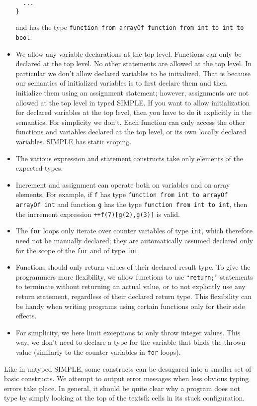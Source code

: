 \begin{latexComment}
\begin{itemize}
\begin{verbatim}
  ...
}
\end{verbatim}
and has the type
\texttt{function from arrayOf function from int to int to bool}.
\item We allow any variable declarations at the top level.  Functions
can only be declared at the top level.  No other statements are
allowed at the top level.  In particular we don't allow declared
variables to be initialized. That is because our semantics of
initialized variables is to first declare them and then initialize
them using an assignment statement; however, assignments are not
allowed at the top level in typed SIMPLE.  If you want to allow
initialization for declared variables at the top level, then you have
to do it explicitly in the semantics.  For simplicity we don't.
Each function can only access the other functions and variables
declared at the top level, or its own locally declared variables.
SIMPLE has static scoping.
\item The various expression and statement constructs take only
elements of the expected types.
\item Increment and assignment can operate both on variables and on
array elements.  For example, if \texttt{f} has type
\texttt{function from int to arrayOf arrayOf int} and function
\texttt{g} has the type \texttt{function from int to int}, then the
increment expression \texttt{++f(7)[g(2),g(3)]} is valid.
\item The \texttt{for} loops only iterate over counter variables of
type \texttt{int}, which therefore need not be manually declared; they
are automatically assumed declared only for the scope of the
\texttt{for} and of type \texttt{int}.
\item Functions should only return values of their declared result
type.  To give the programmers more flexibility, we allow functions to
use ``\texttt{return;}'' statements to terminate without returning an
actual value, or to not explicitly use any return statement,
regardless of their declared return type.  This flexibility can be
handy when writing programs using certain functions only for their
side effects.
\item For simplicity, we here limit exceptions to only throw integer
values.  This way, we don't need to declare a type for the variable
that binds the thrown value (similarly to the counter variables in
\texttt{for} loops).
\end{itemize}
Like in untyped SIMPLE, some constructs can be desugared into a
smaller set of basic constructs.  We attempt to output error messages
when less obvious typing errors take place.  In general, it should be
quite clear why a program does not type by simply looking at the top
of the textsf{k} cells in its stuck configuration.

\end{latexComment}

\vspace*{3ex}
